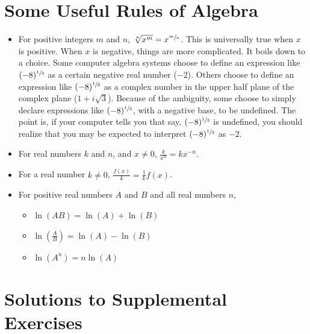\documentclass[10pt,oneside,]{book}
\theoremstyle{plain}
\theoremstyle{definition}
\numberwithin{equation}{section}
\newcommand{\fe}[2]{#1\mathopen{}\left(#2\right)\mathclose{}}
\begin{document}
\chapter[Some Useful Rules of Algebra]{Some Useful Rules of Algebra}\label{appendix-useful-algebra}
\begin{itemize}[label=\textbullet]
\item{}For positive integers \(m\) and \(n\), \(\sqrt[n]{x^m}=x^{\sfrac{m}{n}}\). This is universally true when \(x\) is positive. When \(x\) is negative, things are more complicated. It boils down to a choice. Some computer algebra systems choose to define an expression like \((-8)^{\sfrac{1}{3}}\) as a certain negative real number (\(-2\)). Others choose to define an expression like \((-8)^{\sfrac{1}{3}}\) as a complex number in the upper half plane of the complex plane (\(1+i\sqrt{3}\)). Because of the ambiguity, some choose to simply declare expressions like \((-8)^{\sfrac{1}{3}}\), with a negative base, to be undefined. The point is, if your computer tells you that say, \((-8)^{\sfrac{1}{3}}\) is undefined, you should realize that you may be expected to interpret \((-8)^{\sfrac{1}{3}}\) as \(-2\).\item{}For real numbers \(k\) and \(n\), and \(x\neq0\), \(\frac{k}{x^n}=kx^{-n}\).\item{}For a real number \(k\neq0\), \(\frac{\fe{f}{x}}{k}=\frac{1}{k}\fe{f}{x}\).\item{}For positive real numbers \(A\) and \(B\) and all real numbers \(n\), 
            \begin{itemize}[label=$\circ$]
\item{}\(\fe{\ln}{AB}=\fe{\ln}{A}+\fe{\ln}{B}\)\item{}\(\fe{\ln}{\frac{A}{B}}=\fe{\ln}{A}-\fe{\ln}{B}\)\item{}\(\fe{\ln}{A^n}=n\fe{\ln}{A}\)\end{itemize}

        \end{itemize}
%
\backmatter
%
\typeout{************************************************}
\typeout{************************************************}
\chapter[Solutions to Supplemental Exercises]{Solutions to Supplemental Exercises}\label{supplemental-solutions}
\end{document}
